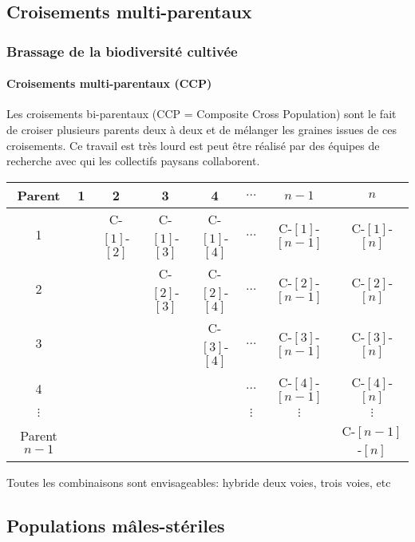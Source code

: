 \subsection{Croisements multi-parentaux}
\begin{frame}
\frametitle{Brassage de la biodiversité cultivée}
\framesubtitle{Croisements multi-parentaux (CCP)}

Les croisements bi-parentaux (CCP = Composite Cross Population) sont le fait de croiser plusieurs parents deux à deux et de mélanger les graines issues de ces croisements.
Ce travail est très lourd est peut être réalisé par des équipes de recherche avec qui les collectifs paysans collaborent.

\scriptsize
\begin{center}
\begin{tabular}{c|ccccccc}
\hline
Parent & 1 & 2 & 3 & 4 & $\ldots$ & $n-1$ & $n$ \\
\hline
1 &  & C-$[1]$-$[2]$ & C-$[1]$-$[3]$ & C-$[1]$-$[4]$ & $\ldots$ & C-$[1]$-$[n-1]$ & C-$[1]$-$[n]$\\
2 &  &  & C-$[2]$-$[3]$ & C-$[2]$-$[4]$ & $\ldots$ & C-$[2]$-$[n-1]$ & C-$[2]$-$[n]$\\
3 &  &  &  & C-$[3]$-$[4]$ & $\ldots$ & C-$[3]$-$[n-1]$ & C-$[3]$-$[n]$\\
4 &  &  &  & & $\ldots$ & C-$[4]$-$[n-1]$ & C-$[4]$-$[n]$\\
$\vdots$ & & & & & $\vdots$ & $\vdots$ & $\vdots$ \\
Parent $n-1$ &  &  &  &  &  &  & C-$[n-1]$-$[n]$\\
\hline
\end{tabular}
\end{center}


\normalsize

Toutes les combinaisons sont envisageables: hybride deux voies, trois voies, etc

\end{frame}


\subsection{Populations mâles-stériles}

